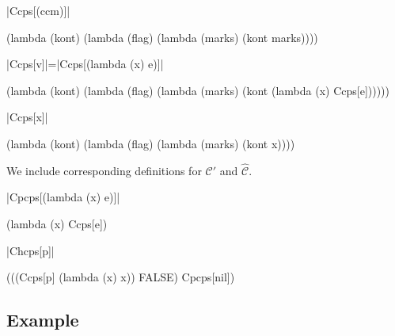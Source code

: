 \documentclass[ms,electronic,twosidetoc,letterpaper,chaptercenter,parttop]{byumsphd}
\begin{document}
\begin{schemedefn}{\scheme|Ccps[(ccm)]|}
\begin{schemedisplay}
(lambda (kont)
  (lambda (flag)
    (lambda (marks)
      (kont marks))))
\end{schemedisplay}
\end{schemedefn}

\begin{schemedefn}{\scheme|Ccps[v]|=\scheme|Ccps[(lambda (x) e)]|}
\begin{schemedisplay}
(lambda (kont)
  (lambda (flag)
    (lambda (marks)
      (kont (lambda (x) Ccps[e])))))
\end{schemedisplay}
\end{schemedefn}

\begin{schemedefn}{\scheme|Ccps[x]|}
\begin{schemedisplay}
(lambda (kont)
  (lambda (flag)
    (lambda (marks)
      (kont x))))
\end{schemedisplay}
\end{schemedefn}

We include corresponding definitions for $\mathcal{C}'$ and $\hat{\mathcal{C}}$.

\begin{schemedefn}{\scheme|Cpcps[(lambda (x) e)]|}
\begin{schemedisplay}
(lambda (x) Ccps[e])
\end{schemedisplay}
\end{schemedefn}

\begin{schemedefn}{\scheme|Chcps[p]|}
\begin{schemedisplay}
(((Ccps[p] (lambda (x) x)) FALSE) Cpcps[nil])
\end{schemedisplay}
\end{schemedefn}

\subsection{Example}
\end{document}
